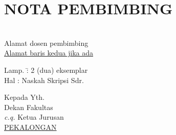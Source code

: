 %
%
%

\chapter*{NOTA PEMBIMBING}

\vspace*{0.2cm}

\begin{spacing}{1}
\noindent
\bo{\pembimbingSatu}\\
Alamat dosen pembimbing\\
\underline{Alamat baris kedua jika ada}\\

\noindent
\begin{tabbing}
Lamp. \hspace{1em}  \= : 2 (dua) eksemplar\\
Hal 				\> : Naskah Skripsi Sdr. \penulis
\end{tabbing}

\noindent
Kepada Yth.\\
Dekan Fakultas \fakultas\\
\textit{c.q.} Ketua Jurusan \program\\
\underline{PEKALONGAN}\\[1em]
\end{spacing}

